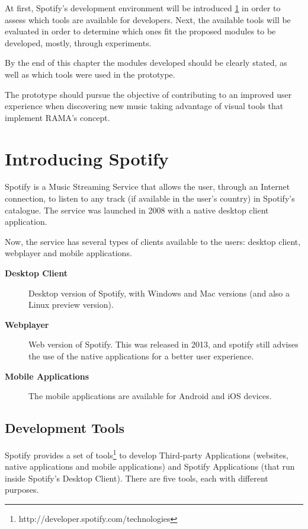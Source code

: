 At first, Spotify's development environment will be introduced \ref{sec:spotify} in order to assess which tools are available for developers.
Next, the available tools will be evaluated in order to determine which ones fit the proposed modules to be developed, mostly, through experiments. 

By the end of this chapter the modules developed should be clearly stated, as well as which tools were used in the prototype.

The prototype should pursue the objective of contributing to an improved user experience when discovering new music taking advantage of visual tools that implement RAMA's concept.

\section{Introducing Spotify} %
\label{sec:spotify}

  Spotify is a Music Streaming Service that allows the user, through an Internet connection, to listen to any track (if available in the user's country) in Spotify's catalogue.
  The service was launched in 2008 with a native desktop client application.

  Now, the service has several types of clients available to the users: desktop client, webplayer and mobile applications.

  \begin{description}
    \item[\textbf{Desktop Client}] Desktop version of Spotify, with Windows and Mac versions (and also a Linux preview version).
    \item[\textbf{Webplayer}] Web version of Spotify. This was released in 2013, and spotify still advises the use of the native applications for a better user experience.
    \item[\textbf{Mobile Applications}] The mobile applications are available for Android and iOS devices.
  \end{description}

  \subsection{Development Tools} %
  \label{sub:devtools}
  
    Spotify provides a set of tools\footnote{http://developer.spotify.com/technologies} to develop Third-party Applications (websites, native applications and mobile applications) and Spotify Applications (that run inside Spotify's Desktop Client).
    There are five tools, each with different purposes.

